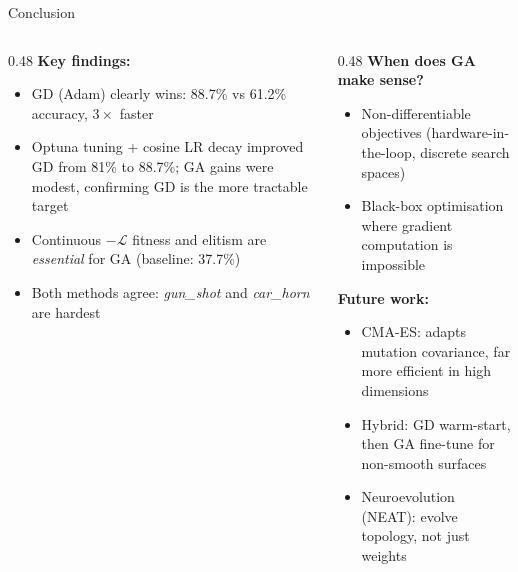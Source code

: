 \documentclass[aspectratio=169,10pt]{beamer}
\begin{document}
\begin{frame}{Conclusion}
  \begin{columns}[T]
    \begin{column}{0.48\textwidth}
      \textbf{Key findings:}
      \begin{itemize}
        \item GD (Adam) clearly wins: 88.7\% vs 61.2\% accuracy, $3\times$ faster
        \item Optuna tuning + cosine LR decay improved GD from 81\% to 88.7\%; GA gains were modest, confirming GD is the more tractable target
        \item Continuous $-\mathcal{L}$ fitness and elitism are \emph{essential} for GA (baseline: 37.7\%)
        \item Both methods agree: \textit{gun\_shot} and \textit{car\_horn} are hardest
      \end{itemize}
    \end{column}
    \begin{column}{0.48\textwidth}
      \textbf{When does GA make sense?}
      \begin{itemize}
        \item Non-differentiable objectives (hardware-in-the-loop, discrete search spaces)
        \item Black-box optimisation where gradient computation is impossible
      \end{itemize}
      \vspace{0.5em}
      \textbf{Future work:}
      \begin{itemize}
        \item CMA-ES: adapts mutation covariance, far more efficient in high dimensions
        \item Hybrid: GD warm-start, then GA fine-tune for non-smooth surfaces
        \item Neuroevolution (NEAT): evolve topology, not just weights
      \end{itemize}
    \end{column}
  \end{columns}
\end{frame}
\end{document}
